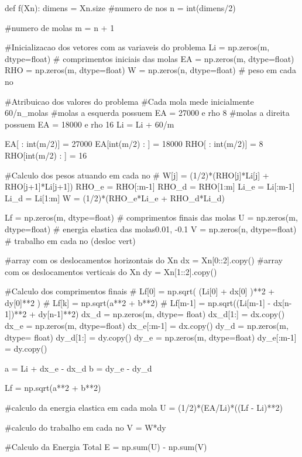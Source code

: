 \documentclass[10pt, a4paper]{article}
\begin{document}
\begin{python}
  def f(Xn):
    dimens = Xn.size
    #numero de nos
    n = int(dimens/2)

    #numero de molas
    m = n + 1

    #Inicializacao dos vetores com as variaveis do problema
    Li = np.zeros(m, dtype=float) # comprimentos iniciais das molas
    EA = np.zeros(m, dtype=float)
    RHO = np.zeros(m, dtype=float)
    W = np.zeros(n, dtype=float) # peso em cada no
    
    #Atribuicao dos valores do problema
    #Cada mola mede inicialmente 60/n_molas
    #molas a esquerda possuem EA = 27000 e rho 8
    #molas a direita possuem EA = 18000 e rho 16
    Li = Li + 60/m

    EA[ : int(m/2)] = 27000
    EA[int(m/2) : ] = 18000
    RHO[ : int(m/2)] = 8
    RHO[int(m/2) : ] = 16
    
    #Calculo dos pesos atuando em cada no
    # W[j] = (1/2)*(RHO[j]*Li[j] + RHO[j+1]*Li[j+1])
    RHO_e = RHO[:m-1]
    RHO_d = RHO[1:m]
    Li_e = Li[:m-1]
    Li_d = Li[1:m]
    W = (1/2)*(RHO_e*Li_e + RHO_d*Li_d)
    
    Lf = np.zeros(m, dtype=float) # comprimentos finais das molas
    U = np.zeros(m, dtype=float) # energia elastica das molas0.01, -0.1    
    V = np.zeros(n, dtype=float) # trabalho em cada no (desloc vert)  
      
    #array com os deslocamentos horizontais do Xn
    dx = Xn[0::2].copy()
    #array com os deslocamentos verticais do Xn
    dy = Xn[1::2].copy()
       
    #Calculo dos comprimentos finais
    # Lf[0] = np.sqrt( (Li[0] + dx[0] )**2 + dy[0]**2 ) 
    # Lf[k] = np.sqrt(a**2 + b**2)
    # Lf[m-1] = np.sqrt((Li[m-1] - dx[n-1])**2 + dy[n-1]**2)
    dx_d = np.zeros(m, dtype= float)
    dx_d[1:] = dx.copy()    
    dx_e = np.zeros(m, dtype=float)
    dx_e[:m-1] = dx.copy()
    dy_d = np.zeros(m, dtype= float)
    dy_d[1:] = dy.copy()
    dy_e = np.zeros(m, dtype=float)
    dy_e[:m-1] = dy.copy()
    
    a = Li + dx_e - dx_d
    b = dy_e - dy_d
    
    Lf = np.sqrt(a**2 + b**2)
    
    #calculo da energia elastica em cada mola
    U = (1/2)*(EA/Li)*((Lf - Li)**2)
    
    #calculo do trabalho em cada no    
    V = W*dy
    
    #Calculo da Energia Total
    E = np.sum(U) - np.sum(V)
    

\end{python}
\end{document}
